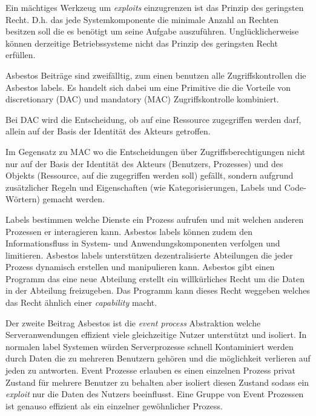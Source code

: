 \documentclass[9pt,technote]{IEEEtran}
\begin{document}
      Ein m\"achtiges Werkzeug um \textit{exploits} einzugrenzen ist das Prinzip des geringsten Recht. D.h. das jede Systemkomponente die minimale Anzahl an Rechten besitzen soll
      die es ben\"otigt um seine Aufgabe auszuf\"uhren. Ungl\"ucklicherweise k\"onnen derzeitige Betriebssysteme nicht das Prinzip des geringsten Recht erf\"ullen.
      
      Asbestos Beitr\"age sind zweif\"alltig, zum einen benutzen alle Zugriffskontrollen die Asbestos labels. Es handelt sich dabei um eine Primitive die die Vorteile
      von discretionary (DAC) und mandatory (MAC) Zugriffskontrolle kombiniert.
      
      Bei DAC wird die Entscheidung, ob auf eine Ressource zugegriffen werden darf,  allein auf der Basis der Identität des Akteurs getroffen. 
      
      Im Gegensatz zu MAC wo die Entscheidungen über Zugriffsberechtigungen nicht nur auf der Basis der Identität des Akteurs (Benutzers, Prozesses) und des Objekts (Ressource, auf die zugegriffen     
      werden soll) gefällt, sondern aufgrund zusätzlicher Regeln und Eigenschaften (wie Kategorisierungen, Labels und Code-Wörtern) gemacht werden.
      
      Labels bestimmen welche Dienste ein Prozess aufrufen und mit welchen anderen Prozessen er interagieren kann. Asbestos labels k\"onnen zudem den Informationsfluss in
      System- und Anwendungskomponenten verfolgen und limitieren.
      Asbestos labels unterst\"utzen dezentralisierte Abteilungen die jeder Prozess dynamisch erstellen und manipulieren kann.
      Asbestos gibt einen Programm das eine neue Abteilung erstellt ein willk\"urliches Recht um die Daten in der Abteilung freizugeben.
      Das Programm kann dieses Recht weggeben welches das Recht \"ahnlich einer \textit{capability} macht.
      
      Der zweite Beitrag Asbestos ist die \textit{event process} Abstraktion welche Serveranwendungen effizient viele gleichzeitige Nutzer unterst\"utzt und isoliert.
      In normalen label Systemen w\"urden Serverprozesse schnell Kontaminiert werden durch Daten die zu mehreren Benutzern geh\"oren und die m\"oglichkeit verlieren auf jeden 
      zu antworten. Event Prozesse erlauben es einen einzelnen Prozess privat Zustand f\"ur mehrere Benutzer zu behalten aber isoliert diesen Zustand sodass ein \textit{exploit}
      nur die Daten des Nutzers beeinflusst. Eine Gruppe von Event Prozessen ist genauso effizient als ein einzelner gew\"ohnlicher Prozess. \cite[S. 1]{inproc:asbestos}
      
\end{document}
